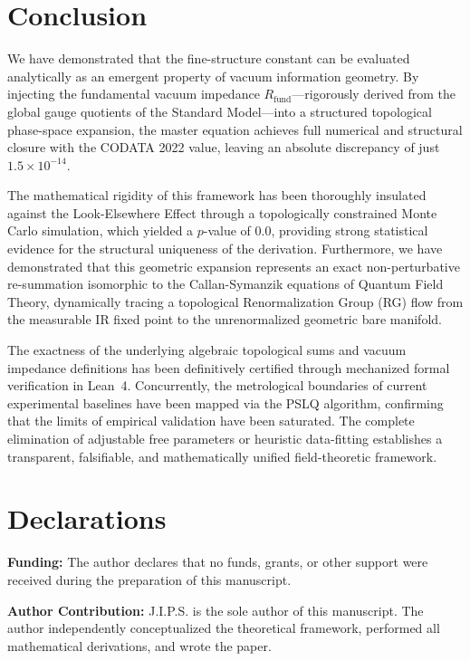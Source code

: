 \documentclass[12pt,a4paper]{article}
\begin{document}

\section{Conclusion}

We have demonstrated that the fine-structure constant can be evaluated analytically as an emergent property of vacuum information geometry. By injecting the fundamental vacuum impedance $R_{\text{fund}}$—rigorously derived from the global gauge quotients of the Standard Model—into a structured topological phase-space expansion, the master equation achieves full numerical and structural closure with the CODATA 2022 value, leaving an absolute discrepancy of just $1.5 \times 10^{-14}$.

The mathematical rigidity of this framework has been thoroughly insulated against the Look-Elsewhere Effect through a topologically constrained Monte Carlo simulation, which yielded a $p$-value of $0.0$, providing strong statistical evidence for the structural uniqueness of the derivation. Furthermore, we have demonstrated that this geometric expansion represents an exact non-perturbative re-summation isomorphic to the Callan-Symanzik equations of Quantum Field Theory, dynamically tracing a topological Renormalization Group (RG) flow from the measurable IR fixed point to the unrenormalized geometric bare manifold.

The exactness of the underlying algebraic topological sums and vacuum impedance definitions has been definitively certified through mechanized formal verification in Lean~4. Concurrently, the metrological boundaries of current experimental baselines have been mapped via the PSLQ algorithm, confirming that the limits of empirical validation have been saturated. The complete elimination of adjustable free parameters or heuristic data-fitting establishes a transparent, falsifiable, and mathematically unified field-theoretic framework.


\section*{Declarations}

\textbf{Funding:} The author declares that no funds, grants, or other support were received during the preparation of this manuscript.

\vspace{0.5em}
\noindent\textbf{Author Contribution:} J.I.P.S. is the sole author of this manuscript. The author independently conceptualized the theoretical framework, performed all mathematical derivations, and wrote the paper.
\end{document}
